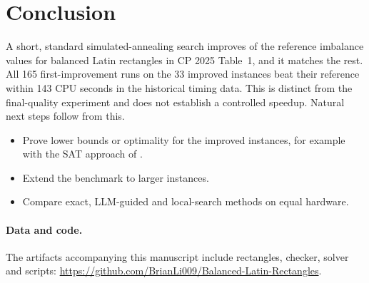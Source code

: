 \documentclass[11pt]{article}
\begin{document}
\section{Conclusion}

A short, standard simulated-annealing search improves \NumImproved{} of the \NumCells{} reference
imbalance values for balanced Latin rectangles in CP 2025 Table~1, and it matches
the rest. All 165 first-improvement runs on the 33 improved instances beat their reference
within 143 CPU seconds in the historical timing data. This is distinct from the
final-quality experiment and does not establish a controlled speedup. Natural next steps follow from this.
\begin{itemize}
\item Prove lower bounds or optimality for the improved instances, for example with the SAT
approach of \citet{RamaswamySzeider2023}.
\item Extend the benchmark to larger instances.
\item Compare exact, LLM-guided and local-search methods on equal hardware.
\end{itemize}

\paragraph{Data and code.} The artifacts accompanying this manuscript include rectangles, checker, solver and scripts:
\url{https://github.com/BrianLi009/Balanced-Latin-Rectangles}.

\FloatBarrier


\end{document}
